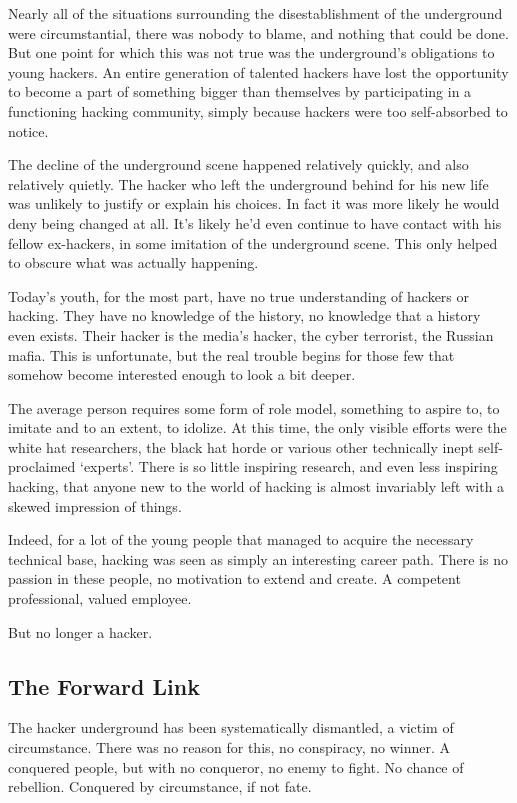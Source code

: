 \documentclass[letterpaper,12pt,english]{sphinxmanual}
\begin{document}
Nearly all of the situations surrounding the disestablishment of the
underground were circumstantial, there was nobody to blame, and nothing
that could be done. But one point for which this was not true was the
underground's obligations to young hackers. An entire generation of
talented hackers have lost the opportunity to become a part of something
bigger than themselves by participating in a functioning hacking
community, simply because hackers were too self-absorbed to notice.

The decline of the underground scene happened relatively quickly, and
also relatively quietly. The hacker who left the underground behind
for his new life was unlikely to justify or explain his choices. In
fact it was more likely he would deny being changed at all. It's likely
he'd even continue to have contact with his fellow ex-hackers, in some
imitation of the underground scene. This only helped to obscure what
was actually happening.

Today's youth, for the most part, have no true understanding of hackers
or hacking. They have no knowledge of the history, no knowledge that
a history even exists. Their hacker is the media's hacker, the cyber
terrorist, the Russian mafia. This is unfortunate, but the real trouble
begins for those few that somehow become interested enough to look a
bit deeper.

The average person requires some form of role model, something to aspire
to, to imitate and to an extent, to idolize. At this time, the only
visible efforts were the white hat researchers, the black hat horde or
various other technically inept self-proclaimed `experts'. There is so
little inspiring research, and even less inspiring hacking, that anyone
new to the world of hacking is almost invariably left with a skewed
impression of things.

Indeed, for a lot of the young people that managed to acquire the
necessary technical base, hacking was seen as simply an interesting career
path. There is no passion in these people, no motivation to extend and
create. A competent professional, valued employee.

But no longer a hacker.


\subsection{The Forward Link}
\label{underground-myth:the-forward-link}
The hacker underground has been systematically dismantled, a victim of
circumstance. There was no reason for this, no conspiracy, no winner. A
conquered people, but with no conqueror, no enemy to fight. No chance
of rebellion. Conquered by circumstance, if not fate.
\end{document}
